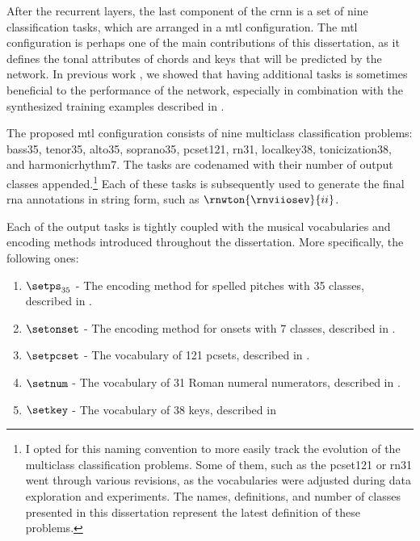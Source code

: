 
After the recurrent layers, the last component of the
\gls{crnn} is a set of nine classification tasks, which are
arranged in a \gls{mtl} configuration. The \gls{mtl}
configuration is perhaps one of the main contributions of
this dissertation, as it defines the tonal attributes of
chords and keys that will be predicted by the network. In
previous work \parencite{napoleslopez2021augmentednet}, we
showed that having additional tasks is sometimes beneficial
to the performance of the network, especially in combination
with the synthesized training examples described in
.

The proposed \gls{mtl} configuration consists of nine
multiclass classification problems: \gls{bass35},
\gls{tenor35}, \gls{alto35}, \gls{soprano35},
\gls{pcset121}, \gls{rn31}, \gls{localkey38},
\gls{tonicization38}, and \gls{harmonicrhythm7}. The tasks
are codenamed with their number of output classes
appended.\footnote{I opted for this naming convention to
more easily track the evolution of the multiclass
classification problems. Some of them, such as the
\gls{pcset121} or \gls{rn31} went through various revisions,
as the vocabularies were adjusted during data exploration
and experiments. The names, definitions, and number of
classes presented in this dissertation represent the latest
definition of these problems.} Each of these tasks is
subsequently used to generate the final \gls{rna}
annotations in string form, such as
$\rnwton{\rnviiosev}{ii}$.

Each of the output tasks is tightly coupled with the musical
vocabularies and encoding methods introduced throughout the
dissertation. More specifically, the following ones:

\begin{enumerate}
    \item[] $\setps_{35}$ - The encoding method for spelled
    pitches with 35 classes, described in
    .
    \item[] $\setonset$ - The encoding method for onsets
    with 7 classes, described in
    .
    \item[] $\setpcset$ - The vocabulary of 121
    \gls{pcset}s, described in
    .
    \item[] $\setnum$ - The vocabulary of 31 Roman numeral
    numerators, described in
    .
    \item[] $\setkey$ - The vocabulary of 38 keys, described
    in
\end{enumerate}

